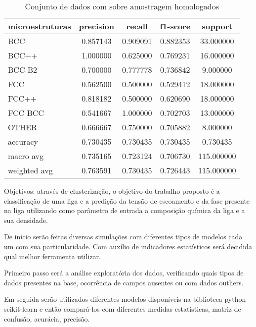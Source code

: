 \begin{table}[htb]
\centering
\caption{Conjunto de dados com sobre amostragem homologados}
\begin{supertabular}{l|c|c|c|c}
\hline
{ microestruturas } & { precision } & { recall } & { f1-score } & { support }\\\hline
{ BCC } &           {0.857143} & {0.909091} & {0.882353} & {33.000000}\\\hline
{ BCC++ } &         {1.000000} & {0.625000} & {0.769231} & {16.000000}\\\hline
{ BCC B2 } &        {0.700000} & {0.777778} & {0.736842} & {9.000000}\\\hline
{ FCC } &           {0.562500} & {0.500000} & {0.529412} & {18.000000}\\\hline
{ FCC++ } &         {0.818182} & {0.500000} & {0.620690} & {18.000000}\\\hline
{ FCC BCC } &       {0.541667} & {1.000000} & {0.702703} & {13.000000}\\\hline
{ OTHER } &         {0.666667} & {0.750000} & {0.705882} & {8.000000}\\\hline
{ accuracy } &      {0.730435} & {0.730435} & {0.730435} & {0.730435}\\\hline
{ macro avg } &     {0.735165} & {0.723124} & {0.706730} & {115.000000}\\\hline
{ weighted avg } &  {0.763591} & {0.730435} & {0.726443} & {115.000000}\\\hline
\end{supertabular}
    \legend{}
    \label{table:relatorio_oversampled_homolog}
\end{table}


Objetivos:
através de clusterização, o objetivo do trabalho proposto é a classificação de uma liga e a predição da tensão de escoamento e da fase presente na liga utilizando como parâmetro de entrada a composição química da liga e a sua densidade.

De início serão feitas diversas simulações com diferentes tipos de modelos cada um com sua particularidade. Com auxílio de indicadores estatísticos será decidida qual melhor ferramenta utilizar.

Primeiro passo será a análise exploratória dos dados, verificando quais tipos de dados presentes na base, ocorrência de campos ausentes ou com dados outliers.

Em seguida serão utilizados diferentes modelos disponíveis na biblioteca python scikit-learn e então compará-los com diferentes medidas estatísticas, matriz de confusão, acurácia, precisão. 

